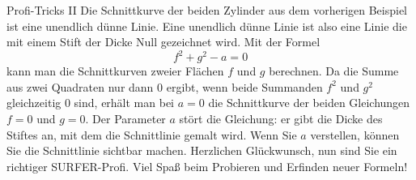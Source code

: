 \begin{surferPage}{Profi-Tricks II}
Die Schnittkurve der beiden Zylinder aus dem vorherigen Beispiel ist eine unendlich dünne Linie. Eine unendlich dünne Linie ist also eine Linie die mit einem Stift der Dicke Null gezeichnet wird. 
Mit der Formel\[ f^2+g^2-a=0\] kann man die Schnittkurven zweier Flächen $f$ und $g$ berechnen. Da die Summe aus zwei Quadraten nur dann $0$ ergibt, wenn beide Summanden $f^2$ und $g^2$ gleichzeitig $0$ sind, erh\"alt man bei $a=0$ die Schnittkurve der beiden Gleichungen $f=0$ und $g=0$.
Der Parameter $a$ st\"ort die Gleichung: er gibt die Dicke des Stiftes an, mit dem die Schnittlinie gemalt wird. Wenn Sie $a$ verstellen, können Sie die Schnittlinie sichtbar machen. 
\newline \newline
Herzlichen Glückwunsch, nun sind Sie ein richtiger SURFER-Profi. Viel Spaß beim Probieren und Erfinden neuer Formeln!
\end{surferPage}

